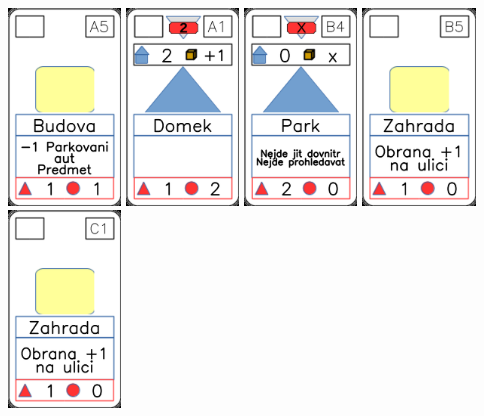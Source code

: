 \documentclass[a4paper]{article}
\begin{document}
	\includegraphics[width=3.0cm]{img-2_4}
	\includegraphics[width=3.0cm]{img-3_0}
	\includegraphics[width=3.0cm]{img-3_23}
	\includegraphics[width=3.0cm]{img-2_24}
	\includegraphics[width=3.0cm]{img-3_25}
\end{document}
